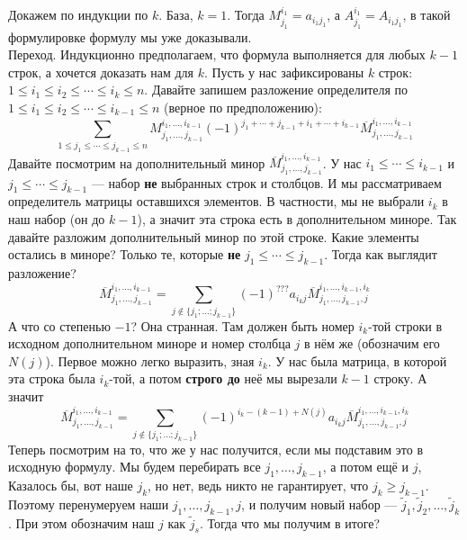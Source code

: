 \documentclass{article}
\begin{document}
\begin{itemize}
\begin{Proof}
            Докажем по индукции по $k$. База, $k=1$. Тогда $M_{j_1}^{i_1}=a_{i_1j_1}$, а $A_{j_1}^{i_1}=A_{i_1j_1}$, в такой формулировке формулу мы уже доказывали.\\
            Переход. Индукционно предполагаем, что формула выполняется для любых $k-1$ строк, а хочется доказать нам для $k$. Пусть у нас зафиксированы $k$ строк: $1\leqslant i_1\leqslant i_2\leqslant\cdots\leqslant i_k\leqslant n$. Давайте запишем разложение определителя по $1\leqslant i_1\leqslant i_2\leqslant\cdots\leqslant i_{k-1}\leqslant n$ (верное по предположению):
            $$
            \sum\limits_{1\leqslant j_1\leqslant\cdots\leqslant j_{k-1}\leqslant n}M_{j_1,\ldots,j_{k-1}}^{i_1,\ldots,i_{k-1}}(-1)^{j_1+\cdots+j_{k-1}+i_1+\cdots+i_{k-1}}\overline M_{j_1,\ldots,j_{k-1}}^{i_1,\ldots,i_{k-1}}
            $$
            Давайте посмотрим на дополнительный минор $\overline M_{j_1,\ldots,j_{k-1}}^{i_1,\ldots,i_{k-1}}$. У нас $i_1\leqslant\cdots\leqslant i_{k-1}$ и $j_1\leqslant\cdots\leqslant j_{k-1}$ --- набор \textbf{не} выбранных строк и столбцов. И мы рассматриваем определитель матрицы оставшихся элементов. В частности, мы не выбрали $i_k$ в наш набор (он до $k-1$), а значит эта строка есть в дополнительном миноре. Так давайте разложим дополнительный минор по этой строке. Какие элементы остались в миноре? Только те, которые \textbf{не} $j_1\leqslant\cdots\leqslant j_{k-1}$. Тогда как выглядит разложение?
            $$
            \overline M_{j_1,\ldots,j_{k-1}}^{i_1,\ldots,i_{k-1}}=\sum_{j\notin\{j_1;\ldots;j_{k-1}\}}(-1)^{???}a_{i_kj}\overline M_{j_1,\ldots,j_{k-1},j}^{i_1,\ldots,i_{k-1},i_k}
            $$
            А что со степенью $-1$? Она странная. Там должен быть номер $i_k$-той строки в исходном дополнительном миноре и номер столбца $j$ в нём же (обозначим его $N(j)$). Первое можно легко выразить, зная $i_k$. У нас была матрица, в которой эта строка была $i_k$-той, а потом \textbf{строго до} неё мы вырезали $k-1$ строку. А значит
            $$
            \overline M_{j_1,\ldots,j_{k-1}}^{i_1,\ldots,i_{k-1}}=\sum_{j\notin\{j_1;\ldots;j_{k-1}\}}(-1)^{i_k-(k-1)+N(j)}a_{i_kj}\overline M_{j_1,\ldots,j_{k-1},j}^{i_1,\ldots,i_{k-1},i_k}
            $$
            Теперь посмотрим на то, что же у нас получится, если мы подставим это в исходную формулу. Мы будем перебирать все $j_1,\ldots,j_{k-1}$, а потом ещё и $j$, Казалось бы, вот наше $j_k$, но нет, ведь никто не гарантирует, что $j_k\geqslant j_{k-1}$. Поэтому перенумеруем наши $j_1,\ldots,j_{k-1},j$, и получим новый набор --- $\tilde j_1,\tilde j_2,\ldots,\tilde j_k$. При этом обозначим наш $j$ как $\tilde j_s$. Тогда что мы получим в итоге?

\end{Proof}
\end{itemize}
\end{document}
